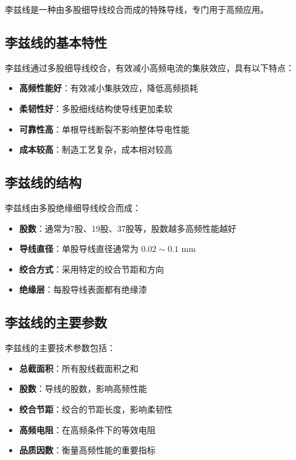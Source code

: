 \documentclass[12pt,UTF8]{ctexbook}
\begin{document}
李兹线是一种由多股细导线绞合而成的特殊导线，专门用于高频应用。

\subsection{李兹线的基本特性}

李兹线通过多股细导线绞合，有效减小高频电流的集肤效应，具有以下特点：

\begin{itemize}[leftmargin=3.5em]
    \item \textbf{高频性能好}：有效减小集肤效应，降低高频损耗
    \item \textbf{柔韧性好}：多股细线结构使导线更加柔软
    \item \textbf{可靠性高}：单根导线断裂不影响整体导电性能
    \item \textbf{成本较高}：制造工艺复杂，成本相对较高
\end{itemize}

\subsection{李兹线的结构}

李兹线由多股绝缘细导线绞合而成：

\begin{itemize}[leftmargin=3.5em]
    \item \textbf{股数}：通常为7股、19股、37股等，股数越多高频性能越好
    \item \textbf{导线直径}：单股导线直径通常为 $0.02 \sim 0.1$ mm
    \item \textbf{绞合方式}：采用特定的绞合节距和方向
    \item \textbf{绝缘层}：每股导线表面都有绝缘漆
\end{itemize}

\subsection{李兹线的主要参数}

李兹线的主要技术参数包括：

\begin{itemize}[leftmargin=3.5em]
    \item \textbf{总截面积}：所有股线截面积之和
    \item \textbf{股数}：导线的股数，影响高频性能
    \item \textbf{绞合节距}：绞合的节距长度，影响柔韧性
    \item \textbf{高频电阻}：在高频条件下的等效电阻
    \item \textbf{品质因数}：衡量高频性能的重要指标
\end{itemize}
\end{document}
